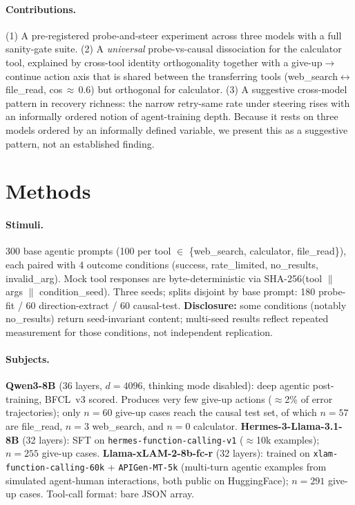 \documentclass{article}
\begin{document}
\paragraph{Contributions.}
(1) A pre-registered probe-and-steer experiment across three models
with a full sanity-gate suite.
(2) A \emph{universal} probe-vs-causal dissociation for the calculator
tool, explained by cross-tool identity orthogonality together with a
give-up$\to$continue action axis that is shared between the transferring
tools (web\_search$\leftrightarrow$file\_read, cos\,$\approx$\,0.6) but
orthogonal for calculator.
(3) A suggestive cross-model pattern in recovery richness: the narrow
retry-same rate under steering rises with an informally ordered notion
of agent-training depth. Because it rests on three models ordered by
an informally defined variable, we present this as a suggestive
pattern, not an established finding.

\section{Methods}
\label{sec:methods}

\paragraph{Stimuli.}
300 base agentic prompts (100 per tool $\in$ \{web\_search,
calculator, file\_read\}), each paired with 4 outcome conditions
(success, rate\_limited, no\_results, invalid\_arg).
Mock tool responses are byte-deterministic via SHA-256(tool $\|$
args $\|$ condition\_seed).  Three seeds; splits disjoint by
base prompt: 180 probe-fit / 60 direction-extract / 60 causal-test.
\textbf{Disclosure:} some conditions (notably no\_results) return
seed-invariant content; multi-seed results reflect repeated
measurement for those conditions, not independent replication.

\paragraph{Subjects.}
\textbf{Qwen3-8B} (36 layers, $d{=}4096$, thinking mode disabled):
deep agentic post-training, BFCL~v3 scored.
Produces very few give-up actions ($\approx$2\% of error trajectories);
only $n{=}60$ give-up cases reach the causal test set, of which $n{=}57$
are file\_read, $n{=}3$ web\_search, and $n{=}0$ calculator.
\textbf{Hermes-3-Llama-3.1-8B} (32 layers): SFT on
\texttt{hermes-function-calling-v1} ($\approx$10k examples);
$n{=}255$ give-up cases.
\textbf{Llama-xLAM-2-8b-fc-r} (32 layers): trained on
\texttt{xlam-function-calling-60k} + \texttt{APIGen-MT-5k} (multi-turn
agentic examples from simulated agent-human interactions, both public
on HuggingFace); $n{=}291$ give-up cases.
Tool-call format: bare JSON array.
\end{document}
